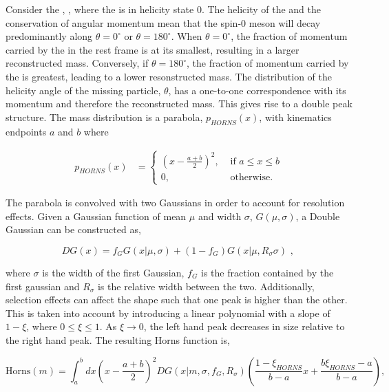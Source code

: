 Consider the \decay{\Bm}{\Dstarz\Kstarm}, \decay{\Dstarz}{\Dz\piz}, where the \Dstarz is in helicity state 0. The helicity of the \Dstarz and the conservation of angular momentum mean that the spin-0 \piz meson will decay predominantly along $\theta = 0^{\circ}$ or $\theta = 180^{\circ}$. When $\theta = 0^{\circ}$, the fraction of momentum carried by the \piz in the \B rest frame is at its smallest, resulting in a larger reconstructed \B mass. Conversely, if $\theta = 180^{\circ}$, the fraction of momentum carried by the \piz is greatest, leading to a lower resonstructed \B mass. The distribution of the helicity angle of the missing particle, $\theta$, has a one-to-one correspondence with its momentum and therefore the reconstructed \B mass. This gives rise to a double peak structure. The \B mass distribution is a parabola, $p_{HORNS}(x)$, with kinematics endpoints $a$ and $b$ where

\begin{align}
p_{HORNS}(x) &= \begin{cases}
\left(x - \frac{a+b}{2}\right)^2, & \text{ if $a \leq x \leq b$}\\ 	
0, & \text{ otherwise.}
\end{cases} 
\end{align}

The parabola is convolved with two Gaussians in order to account for resolution effects. Given a Gaussian function of mean $\mu$ and width $\sigma$, $G(\mu,\sigma)$, a Double Gaussian can be constructed as,

\begin{equation}
DG(x) = f_G G(x|\mu,\sigma) + \left(1-f_G\right) G(x|\mu,R_{\sigma}\sigma) \text{ , }
\end{equation}

where $\sigma$ is the width of the first Gaussian, $f_G$ is the fraction contained by the first gaussian and $R_{\sigma}$ is the relative width between the two. Additionally, selection effects can affect the shape such that one peak is higher than the other. This is taken into account by introducing a linear polynomial with a slope of $1 - \xi$, where $0 \leq \xi \leq 1$. As $\xi \rightarrow 0$, the left hand peak decreases in size relative to the right hand peak. The resulting Horns function is,

\begin{equation}
\text{Horns}(m) = \int_a^b dx \left(x - \frac{a+b}{2}\right)^2 DG(x|m,\sigma,f_G,R_{\sigma}) \left( \frac{1 - \xi_{HORNS}}{b - a}x + \frac{b\xi_{HORNS} - a}{b - a}\right),
\label{eqn:horns}
\end{equation}


